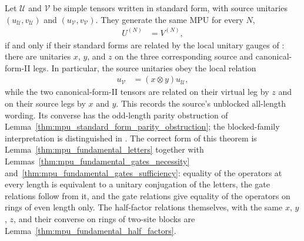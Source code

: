 \begin{theorem}
    \label{FundamentalMPU}
    \notready
    Let $\mathcal U$ and $\mathcal V$ be simple tensors written in standard
    form, with source unitaries $(u_{\mathcal U},v_{\mathcal U})$ and
    $(u_{\mathcal V},v_{\mathcal V})$. They generate the same MPU for every
    $N$,
    \begin{align}
        U^{(N)} & =V^{(N)},
    \end{align}
    if and only if their standard forms are related by the local unitary gauges
    of \cite[Eqns.~(SFuu) and (SFvv)]{Cirac2017MPU}: there are unitaries $x$,
    $y$, and $z$ on the three corresponding source and canonical-form-II legs.
    In particular, the source unitaries obey the local relation
    \begin{align}
        u_{\mathcal V} & =(x\otimes y)u_{\mathcal U},
    \end{align}
    while the two canonical-form-II tensors are related on their virtual leg by
    $z$ and on their source legs by $x$ and $y$. This records the source's
    unblocked all-length wording. Its converse has the odd-length parity
    obstruction of Lemma~\ref{thm:mpu_standard_form_parity_obstruction};
    the blocked-family interpretation is distinguished in
    \cite{gap:mpu_standard_form_parity_gap}. The correct form of this
    theorem is Lemma~\ref{thm:mpu_fundamental_letters} together with
    Lemmas~\ref{thm:mpu_fundamental_gates_necessity}
    and~\ref{thm:mpu_fundamental_gates_sufficiency}: equality of the
    operators at every length is equivalent to a unitary conjugation of the
    letters, the gate relations follow from it, and the gate relations give
    equality of the operators on rings of even length only.
    The half-factor relations themselves, with the same $x$, $y$, $z$, and
    their converse on rings of two-site blocks are
    Lemma~\ref{thm:mpu_fundamental_half_factors}.
\end{theorem}

